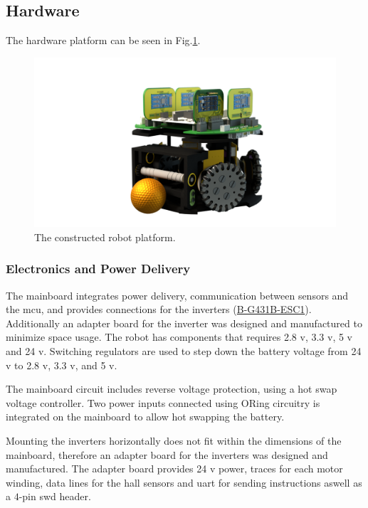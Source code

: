 
\subsection{Hardware}

The hardware platform can be seen in Fig.\:\ref{fig:robot_base}.
\begin{figure}[H]
	\centering
	\includegraphics[width=0.5\linewidth]{images/robot_base.png}
	\caption{The constructed robot platform.}
	\label{fig:robot_base}
\end{figure}

\subsubsection{Electronics and Power Delivery}
The mainboard integrates power delivery, communication between sensors and the \ac{mcu}, and provides connections for the inverters (\hyperlink{bom:B-G431B-ESC1}{B-G431B-ESC1}). Additionally an adapter board for the inverter was designed and manufactured to minimize space usage.
The robot has components that requires 2.8 \ac{v}, 3.3 \ac{v}, 5 \ac{v} and 24 \ac{v}. Switching regulators are used to step down the battery voltage from 24 \ac{v} to 2.8 \ac{v}, 3.3 \ac{v}, and 5 \ac{v}.

The mainboard circuit includes reverse voltage protection, using a hot swap voltage controller.
Two power inputs connected using ORing circuitry is integrated on the mainboard to allow hot swapping the battery.

Mounting the inverters horizontally does not fit within the dimensions of the mainboard, therefore an adapter board for the inverters was designed and manufactured. The adapter board provides 24 \ac{v} power, traces for each motor winding, data lines for the hall sensors and \ac{uart} for sending instructions aswell as a \(4\)-pin \ac{swd} header.

